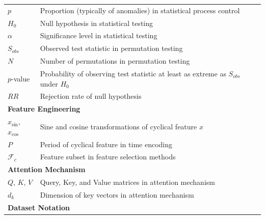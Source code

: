 \begin{appendices}
\begin{longtable}{p{}p{}}
    $p$                                         & Proportion (typically of anomalies) in statistical process control                   \\
    $H_0$                                       & Null hypothesis in statistical testing                                               \\
    $\alpha$                                    & Significance level in statistical testing                                            \\
    $S_{obs}$                                   & Observed test statistic in permutation testing                                       \\
    $N$                                         & Number of permutations in permutation testing                                        \\
    $p$-value                                   & Probability of observing test statistic at least as extreme as $S_{obs}$ under $H_0$ \\
    $RR$                                        & Rejection rate of null hypothesis                                                    \\
    \midrule
    \multicolumn{2}{l}{\textbf{Feature Engineering}}                                                                                   \\
    \midrule
    $x_{\sin}$, $x_{\cos}$                      & Sine and cosine transformations of cyclical feature $x$                              \\
    $P$                                         & Period of cyclical feature in time encoding                                          \\
    $\mathcal{F}_c$                             & Feature subset in feature selection methods                                          \\
    \midrule
    \multicolumn{2}{l}{\textbf{Attention Mechanism}}                                                                                   \\
    \midrule
    $Q$, $K$, $V$                               & Query, Key, and Value matrices in attention mechanism                                \\
    $d_k$                                       & Dimension of key vectors in attention mechanism                                      \\
    \midrule
    \multicolumn{2}{l}{\textbf{Dataset Notation}}                                                                                      \\

\end{longtable}
\end{appendices}
